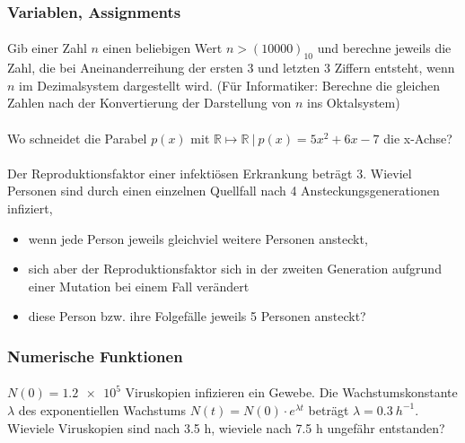 \documentclass[paper=A4, pagesize, DIV=calc, smallheadings,
fontsize=12pt, expansion=false]{scrreprt}
\begin{document}
\subsubsection*{Variablen, Assignments}
\paragraph{}
Gib einer Zahl $n$ einen beliebigen Wert $n > (10000)_{10}$ und berechne jeweils die Zahl, die bei Aneinanderreihung 
der 
ersten 3 und letzten 3 Ziffern entsteht, wenn $n$ im Dezimalsystem dargestellt wird. (Für Informatiker: Berechne die 
gleichen Zahlen nach der Konvertierung der Darstellung von $n$ ins Oktalsystem)
\paragraph{}
Wo schneidet die Parabel $p(x)$  mit $\mathbb{R}\mapsto \mathbb{R}~ |~  p(x)=5x^2 + 6x - 7 $ die x-Achse?
\paragraph{}
Der Reproduktionsfaktor einer infektiösen Erkrankung beträgt 3. Wieviel Personen sind durch einen einzelnen Quellfall 
nach 4 Ansteckungsgenerationen infiziert,
\begin{itemize}
\item wenn jede Person jeweils gleichviel weitere Personen ansteckt, 
\item sich aber der 
Reproduktionsfaktor sich in der zweiten Generation aufgrund einer Mutation bei einem Fall verändert 
\item diese Person 
bzw. ihre Folgefälle jeweils 5 Personen ansteckt?
\end{itemize}
\subsubsection*{Numerische Funktionen}

\paragraph{}
$N(0) = \num{1.2e5}$ Viruskopien infizieren ein Gewebe. Die Wachstumskonstante $\lambda$ des exponentiellen Wachstums
$ N(t) = N(0) \cdot e^{\lambda t}$ beträgt $\lambda = \SI{0.3}{h^{-1}}$. Wieviele Viruskopien sind nach 3.5 h, 
wieviele nach 7.5 h ungefähr entstanden?
\end{document}
